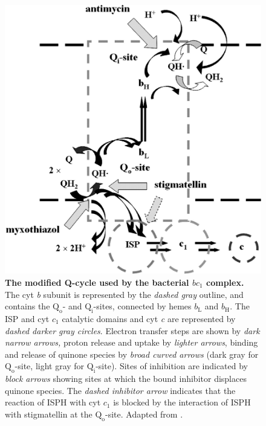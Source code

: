 \begin{figure}[tbp]
	\begin{center}
		\includegraphics[width=14cm]{01-introduction/data/q-cycle.png}
	\caption[The modified Q-cycle used by the bacterial $bc_1$ complex.]{{\bf The modified Q-cycle used by the bacterial $bc_1$ complex.}  The cyt \textit{b} subunit is represented by the \textit{dashed gray} outline, and contains the $\mathrm{Q}_\mathrm{o}$- and $\mathrm{Q}_\mathrm{i}$-sites, connected by hemes $b_\mathrm{L}$ and $b_\mathrm{H}$. The ISP and cyt $c_1$ catalytic domains and cyt \textit{c} are represented by \textit{dashed darker gray circles}. Electron transfer steps are shown by \textit{dark narrow arrows,} proton release and uptake by \textit{lighter arrows}, binding and release of quinone species by \textit{broad curved arrows} (dark gray for $\mathrm{Q}_\mathrm{o}$-site, light gray for $\mathrm{Q}_\mathrm{i}$-site). Sites of inhibition are indicated by \textit{block arrows} showing sites at which the bound inhibitor displaces quinone species. The \textit{dashed inhibitor arrow} indicates that the reaction of ISPH with cyt $c_1$ is blocked by the interaction of ISPH with stigmatellin at the $\mathrm{Q}_\mathrm{o}$-site. Adapted from \citet{Crofts2003}.
	\label{fig:q-cycle}}
	\end{center}
\end{figure}

